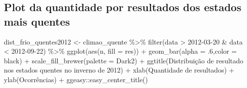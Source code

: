 \documentclass[
]{article}
\newenvironment{Shaded}{\begin{snugshade}}{\end{snugshade}}
\newcommand{\AttributeTok}[1]{\textcolor[rgb]{0.77,0.63,0.00}{#1}}
\newcommand{\DecValTok}[1]{\textcolor[rgb]{0.00,0.00,0.81}{#1}}
\newcommand{\FunctionTok}[1]{\textcolor[rgb]{0.00,0.00,0.00}{#1}}
\newcommand{\NormalTok}[1]{#1}
\newcommand{\OtherTok}[1]{\textcolor[rgb]{0.56,0.35,0.01}{#1}}
\newcommand{\SpecialCharTok}[1]{\textcolor[rgb]{0.00,0.00,0.00}{#1}}
\newcommand{\StringTok}[1]{\textcolor[rgb]{0.31,0.60,0.02}{#1}}
\begin{document}
\hypertarget{plot-da-quantidade-por-resultados-dos-estados-mais-quentes}{%
\subsection{Plot da quantidade por resultados dos estados mais
quentes}\label{plot-da-quantidade-por-resultados-dos-estados-mais-quentes}}

\begin{Shaded}
\begin{Highlighting}[]
\NormalTok{dist\_frio\_quentes2012 }\OtherTok{\textless{}{-}}\NormalTok{ climao\_quente }\SpecialCharTok{\%\textgreater{}\%} 
  \FunctionTok{filter}\NormalTok{(data }\SpecialCharTok{\textgreater{}} \StringTok{\textquotesingle{}2012{-}03{-}20\textquotesingle{}} \SpecialCharTok{\&}\NormalTok{ data }\SpecialCharTok{\textless{}} \StringTok{\textquotesingle{}2012{-}09{-}22\textquotesingle{}}\NormalTok{) }\SpecialCharTok{\%\textgreater{}\%}
  \FunctionTok{ggplot}\NormalTok{(}\FunctionTok{aes}\NormalTok{(n, }\AttributeTok{fill =}\NormalTok{ res)) }\SpecialCharTok{+} 
  \FunctionTok{geom\_bar}\NormalTok{(}\AttributeTok{alpha =}\NormalTok{ .}\DecValTok{6}\NormalTok{,}\AttributeTok{color =} \StringTok{\textquotesingle{}black\textquotesingle{}}\NormalTok{) }\SpecialCharTok{+} 
  \FunctionTok{scale\_fill\_brewer}\NormalTok{(}\AttributeTok{palette =} \StringTok{\textquotesingle{}Dark2\textquotesingle{}}\NormalTok{) }\SpecialCharTok{+}
  \FunctionTok{ggtitle}\NormalTok{(}\StringTok{\textquotesingle{}Distribuição de resultado nos estados quentes no inverno de 2012\textquotesingle{}}\NormalTok{) }\SpecialCharTok{+}
  \FunctionTok{xlab}\NormalTok{(}\StringTok{\textquotesingle{}Quantidade de resultados\textquotesingle{}}\NormalTok{) }\SpecialCharTok{+} \FunctionTok{ylab}\NormalTok{(}\StringTok{\textquotesingle{}Ocorrências\textquotesingle{}}\NormalTok{) }\SpecialCharTok{+}
\NormalTok{  ggeasy}\SpecialCharTok{::}\FunctionTok{easy\_center\_title}\NormalTok{()}


\end{Highlighting}
\end{Shaded}
\end{document}
